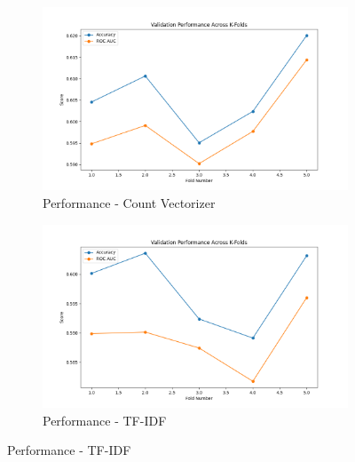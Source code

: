 \begin{figure}[H]
    \centering
    \begin{subfigure}[b]{0.48\textwidth}
        \includegraphics[width=\textwidth]{img/report_info/img/1.2.DecisionTree/best_decision_tree_count.png}
        \caption{Performance - Count Vectorizer}
        \label{fig:lr-count}
    \end{subfigure}
    \begin{subfigure}[b]{0.48\textwidth}
        \includegraphics[width=\textwidth]{img/report_info/img/1.2.DecisionTree/best_decision_tree_tfidf.png}
        \caption{Performance - TF-IDF}
        \label{fig:lr-tfidf}
    \end{subfigure}
    

\end{figure}
